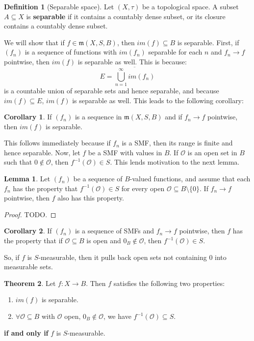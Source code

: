 \documentclass[11pt, oneside]{amsart}   	%
\theoremstyle{definition}
\newtheorem{definition}{Definition}[section]
\newtheorem{theorem}{Theorem}[section]
\newtheorem{corollary}{Corollary}[theorem]
\newtheorem{lemma}[theorem]{Lemma}
\begin{document}
	\begin{definition}[Separable space]
		Let $(X, \tau)$ be a topological space. A subset $A\subseteq X$ is \textbf{separable} if it contains a countably dense 
		subset, or its closure contains a countably dense subset.
	\end{definition}
	
	We will show that if $f\in\mathfrak m(X, S, B)$, then $im(f)\subseteq B$ is separable. First, if $(f_n)$ is a sequence of 
	functions with $im(f_n)$ separable for each $n$ and $f_n\rightarrow f$ pointwise, then $im(f)$ is separable as well. 
	This is because:
	$$
		E = \overline{\bigcup_{n = 1}^\infty im(f_n)}
	$$
	is a countable union of separable sets and hence separable, and because $im(f)\subseteq E$, $im(f)$ is separable as 
	well. This leads to the following corollary:
	
	\begin{corollary}
		If $(f_n)$ is a sequence in $\mathfrak m(X, S, B)$ and if $f_n\rightarrow f$ pointwise, then $im(f)$ is separable.
	\end{corollary}
	
	This follows immediately because if $f_n$ is a SMF, then its range is finite and hence separable. Now, let
	$f$ be a SMF with values in $B$. If $\mathcal O$ is an open set in $B$ such that $0\notin\mathcal O$, then 
	$f^{-1}(\mathcal O)\in S$. This lends motivation to the next lemma.
	
	\begin{lemma}
		Let $(f_n)$ be a sequence of $B$-valued functions, and assume that each $f_n$ has the property that 
		$f^{-1}(\mathcal O)\in S$ for every open $\mathcal O\subseteq B\setminus\{0\}$. If $f_n\rightarrow f$ pointwise, 
		then $f$ also has this property. 
	\end{lemma}
	
	\begin{proof}
		TODO.
	\end{proof}
	
	\begin{corollary}
		If $(f_n)$ is a sequence of SMFs and $f_n\rightarrow f$ pointwise, then $f$ has the property that if $\mathcal O
		\subseteq B$ is open and $0_B\notin\mathcal O$, then $f^{-1}(\mathcal O)\in S$.
	\end{corollary}
	
	So, if $f$ is $S$-measurable, then it pulls back open sets not containing $0$ into measurable sets. 
	
	\begin{theorem}
		Let $f : X\rightarrow B$. Then $f$ satisfies the following two properties:
		\begin{enumerate}
			\item $im(f)$ is separable.
			\item $\forall\mathcal O\subseteq B$ with $\mathcal O$ open, $0_B\notin\mathcal O$, we have 
			$f^{-1}(\mathcal O)\subseteq S$. 
		\end{enumerate}
		\textbf{if and only if} $f$ is $S$-measurable.
	\end{theorem}
	
\end{document}
